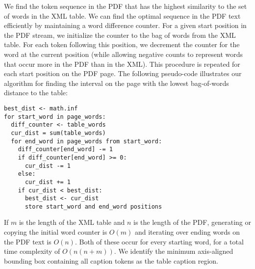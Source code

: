 \documentclass[sigconf]{acmart}
\begin{document}
We find the token sequence in the PDF that has the highest similarity to the set of words in the XML table. 
We can find the optimal sequence in the PDF text efficiently by maintaining a word difference counter. 
For a given start position in the PDF stream, we initialize the counter to the bag of words from the XML table.
For each token following this position, we decrement the counter for the word at the current position (while allowing negative counts to represent words that occur more in the PDF than in the XML). 
This procedure is repeated for each start position on the PDF page. The following pseudo-code illustrates our algorithm for finding the interval on the page with the lowest bag-of-words distance to the table:
\begin{verbatim}
best_dist <- math.inf
for start_word in page_words:
  diff_counter <- table_words
  cur_dist = sum(table_words)
  for end_word in page_words from start_word:
    diff_counter[end_word] -= 1
    if diff_counter[end_word] >= 0:
      cur_dist -= 1
    else:
      cur_dist += 1
    if cur_dist < best_dist:
      best_dist <- cur_dist
      store start_word and end_word positions
\end{verbatim}
If $m$ is the length of the XML table and $n$ is the length of the PDF, generating or copying the initial word counter is $O(m)$ and iterating over ending words on the PDF text is $O(n)$. Both of these occur for every starting word, for a total time complexity of $O(n(n+m))$. 
We identify the minimum axis-aligned bounding box containing all caption tokens as the table caption region.
\end{document}
